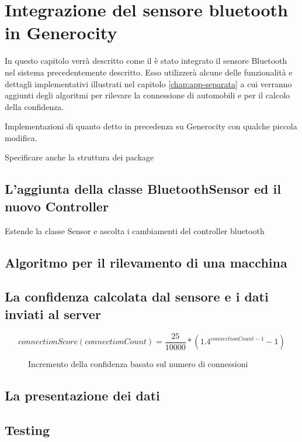 \chapter{Integrazione del sensore bluetooth in Generocity} \label{chap:Bluetooth-sensor}
In questo capitolo verrà descritto come il è stato integrato il sensore Bluetooth nel sistema precedentemente descritto. Esso utilizzerà alcune delle funzionalità e dettagli implementativi illustrati nel capitolo \ref{chap:app-separata} a cui verranno aggiunti degli algoritmi per rilevare la connessione di automobili e per il calcolo della confidenza.

Implementazioni di quanto detto in precedenza su Generocity con qualche piccola modifica.

Specificare anche la struttura dei package

\section{L'aggiunta della classe BluetoothSensor ed il nuovo Controller}
Estende la classe Sensor e ascolta i cambiamenti del controller bluetooth

\section{Algoritmo per il rilevamento di una macchina}

\section{La confidenza calcolata dal sensore e i dati inviati al server}
\[connectionScore(connectionCount) = \frac{25}{10000} * (1.4^{connectionCount-1} - 1)\]

\begin{figure}[t]
    \centering
    \caption{Incremento della confidenza basato sul numero di connessioni}
    \label{fig:confidence-func}
\end{figure}

\section{La presentazione dei dati}
\section{Testing}